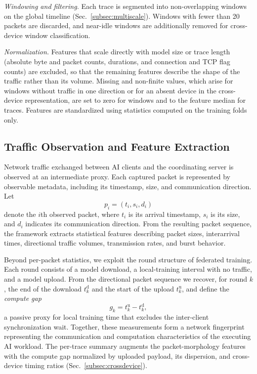 \emph{Windowing and filtering.} Each trace is segmented into non-overlapping
windows on the global timeline (Sec.~\ref{subsec:multiscale}). Windows with
fewer than 20 packets are discarded, and near-idle windows are additionally
removed for cross-device window classification.

\emph{Normalization.} Features that scale directly with model size or trace
length (absolute byte and packet counts, durations, and connection and TCP flag
counts) are excluded, so that the remaining features describe the shape of the
traffic rather than its volume. Missing and non-finite values, which arise for
windows without traffic in one direction or for an absent device in the
cross-device representation, are set to zero for windows and to the feature
median for traces. Features are standardized using statistics computed on the
training folds only.

\subsection{Traffic Observation and Feature Extraction}
Network traffic exchanged between AI clients and the coordinating server is
observed at an intermediate proxy. Each captured packet is represented by
observable metadata, including its timestamp, size, and communication direction.
Let
\begin{equation}
p_i = (t_i, s_i, d_i)
\label{eq:packet}
\end{equation}
denote the $i$th observed packet, where $t_i$ is its arrival timestamp, $s_i$ is
its size, and $d_i$ indicates its communication direction. From the resulting
packet sequence, the framework extracts statistical features describing packet
sizes, interarrival times, directional traffic volumes, transmission rates, and
burst behavior.

Beyond per-packet statistics, we exploit the round structure of federated
training. Each round consists of a model download, a local-training interval
with no traffic, and a model upload. From the directional packet sequence we
recover, for round $k$, the end of the download $t^{\mathrm{d}}_{k}$ and the
start of the upload $t^{\mathrm{u}}_{k}$, and define the \emph{compute gap}
\begin{equation}
g_k = t^{\mathrm{u}}_{k} - t^{\mathrm{d}}_{k},
\label{eq:gap}
\end{equation}
a passive proxy for local training time that excludes the inter-client
synchronization wait. Together, these measurements form a network fingerprint
representing the communication and computation characteristics of the executing
AI workload. The per-trace summary augments the packet-morphology features with
the compute gap normalized by uploaded payload, its dispersion, and cross-device
timing ratios (Sec.~\ref{subsec:crossdevice}).

